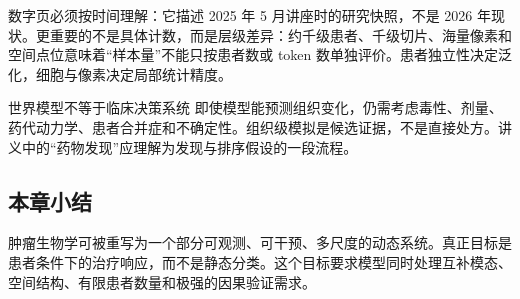
数字页必须按时间理解：它描述 2025 年 5 月讲座时的研究快照，不是 2026 年现状。更重要的不是具体计数，而是层级差异：约千级患者、千级切片、海量像素和空间点位意味着“样本量”不能只按患者数或 token 数单独评价。患者独立性决定泛化，细胞与像素决定局部统计精度。


\begin{warningbox}{世界模型不等于临床决策系统}
即使模型能预测组织变化，仍需考虑毒性、剂量、药代动力学、患者合并症和不确定性。组织级模拟是候选证据，不是直接处方。讲义中的“药物发现”应理解为发现与排序假设的一段流程。
\end{warningbox}

\subsection{本章小结}

肿瘤生物学可被重写为一个部分可观测、可干预、多尺度的动态系统。真正目标是患者条件下的治疗响应，而不是静态分类。这个目标要求模型同时处理互补模态、空间结构、有限患者数量和极强的因果验证需求。

